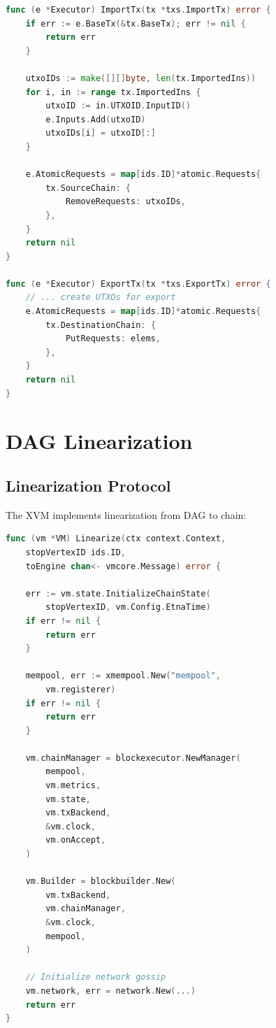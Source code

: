 \documentclass[11pt,a4paper]{article}
\begin{document}
\begin{lstlisting}[language=Go,caption={Atomic Request Generation}]
func (e *Executor) ImportTx(tx *txs.ImportTx) error {
    if err := e.BaseTx(&tx.BaseTx); err != nil {
        return err
    }

    utxoIDs := make([][]byte, len(tx.ImportedIns))
    for i, in := range tx.ImportedIns {
        utxoID := in.UTXOID.InputID()
        e.Inputs.Add(utxoID)
        utxoIDs[i] = utxoID[:]
    }

    e.AtomicRequests = map[ids.ID]*atomic.Requests{
        tx.SourceChain: {
            RemoveRequests: utxoIDs,
        },
    }
    return nil
}

func (e *Executor) ExportTx(tx *txs.ExportTx) error {
    // ... create UTXOs for export
    e.AtomicRequests = map[ids.ID]*atomic.Requests{
        tx.DestinationChain: {
            PutRequests: elems,
        },
    }
    return nil
}
\end{lstlisting}

\section{DAG Linearization}

\subsection{Linearization Protocol}

The XVM implements linearization from DAG to chain:

\begin{lstlisting}[language=Go,caption={Linearization}]
func (vm *VM) Linearize(ctx context.Context,
    stopVertexID ids.ID,
    toEngine chan<- vmcore.Message) error {

    err := vm.state.InitializeChainState(
        stopVertexID, vm.Config.EtnaTime)
    if err != nil {
        return err
    }

    mempool, err := xmempool.New("mempool",
        vm.registerer)
    if err != nil {
        return err
    }

    vm.chainManager = blockexecutor.NewManager(
        mempool,
        vm.metrics,
        vm.state,
        vm.txBackend,
        &vm.clock,
        vm.onAccept,
    )

    vm.Builder = blockbuilder.New(
        vm.txBackend,
        vm.chainManager,
        &vm.clock,
        mempool,
    )

    // Initialize network gossip
    vm.network, err = network.New(...)
    return err
}
\end{lstlisting}
\end{document}
